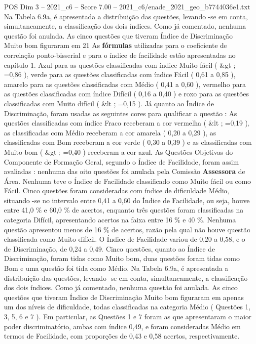 \begin{textsample}{POS Dim 3 – 2021\_c6 – Score 7.00 – 2021\_c6/enade\_2021\_geo\_b7744036e1.txt}
Na Tabela 6.9a, é apresentada a distribuição das questões, levando -se em conta, simultaneamente, a classificação dos dois índices.
Como já comentado, nenhuma questão foi anulada.
As cinco questões que tiveram Índice de Discriminação Muito bom figuraram em 21 As \textbf{fórmulas} utilizadas para o coeficiente de correlação ponto-bisserial e para o índice de facilidade estão apresentadas no capítulo 1.
Azul para as questões classificadas com índice Muito fácil ( \&gt ; =0,86 ), verde para as questões classificadas com índice Fácil ( 0,61 a 0,85 ), amarelo para as questões classificadas com Médio ( 0,41 a 0,60 ), vermelho para as questões classificadas com índice Difícil ( 0,16 a 0,40 ) e roxo para as questões classificadas com Muito difícil ( \&lt ; =0,15 ).
Já quanto ao Índice de Discriminação, foram usadas as seguintes cores para qualificar a questão : As questões classificadas com índice Fraco receberam a cor vermelha ( \&lt ; =0,19 ), as classificadas com Médio receberam a cor amarela ( 0,20 a 0,29 ), as classificadas com Bom receberam a cor verde ( 0,30 a 0,39 ) e as classificadas com Muito bom ( \&gt ; =0,40 ) receberam a cor azul.
As Questões Objetivas do Componente de Formação Geral, segundo o Índice de Facilidade, foram assim avaliadas : nenhuma das oito questões foi anulada pela Comissão \textbf{Assessora} de Área.
Nenhuma teve o Índice de Facilidade classificado como Muito fácil ou como Fácil.
Cinco questões foram consideradas com índice de dificuldade Médio, situando -se no intervalo entre 0,41 a 0,60 do Índice de Facilidade, ou seja, houve entre 41,0 \% e 60,0 \% de acertos, enquanto três questões foram classificadas na categoria Difícil, apresentando acertos na faixa entre 16 \% e 40 \%.
Nenhuma questão apresentou menos de 16 \% de acertos, razão pela qual não houve questão classificada como Muito difícil.
O Índice de Facilidade variou de 0,20 a 0,58, e o de Discriminação, de 0,24 a 0,49.
Cinco questões, quanto ao Índice de Discriminação, foram tidas como Muito bom, duas questões foram tidas como Bom e uma questão foi tida como Médio.
Na Tabela 6.9a, é apresentada a distribuição das questões, levando -se em conta, simultaneamente, a classificação dos dois índices.
Como já comentado, nenhuma questão foi anulada.
As cinco questões que tiveram Índice de Discriminação Muito bom figuraram em apenas um dos níveis de dificuldade, todas classificadas na categoria Médio ( Questões 1, 3, 5, 6 e 7 ).
Em particular, as Questões 1 e 7 foram as que apresentaram o maior poder discriminatório, ambas com índice 0,49, e foram consideradas Médio em termos de Facilidade, com proporções de 0,43 e 0,58 acertos, respectivamente.

\end{textsample}
